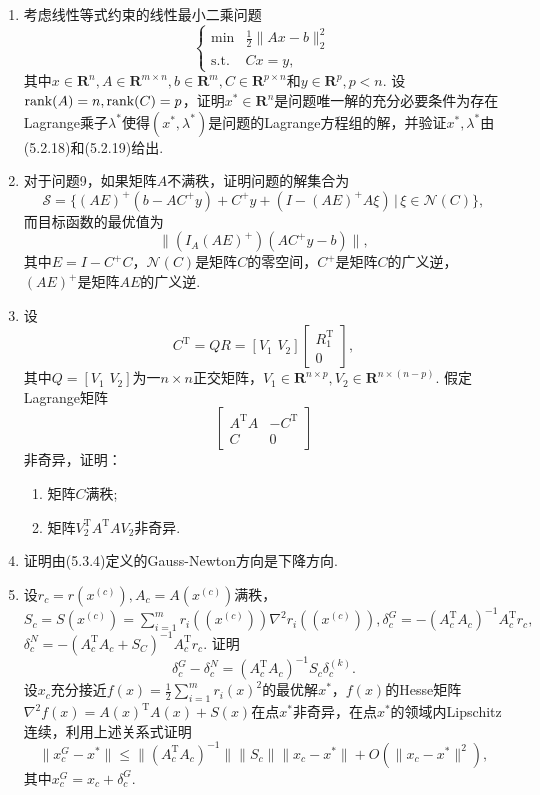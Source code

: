 \begin{enumerate}
    \omitted
    \item 考虑线性等式约束的线性最小二乘问题\[\begin{cases}
        \min & \displaystyle \frac{1}{2}\|Ax-b\|_2^2\\
        \text{s.t.} & Cx=y,
    \end{cases}\]其中$x \in \textbf{R}^n,A \in \textbf{R}^{m \times n},b \in \textbf{R}^m, C \in \textbf{R}^{p \times n}$和$y \in \textbf{R}^p,p<n$. 设$\text{rank}(A)=n,\text{rank}(C)=p$，证明$x^* \in \textbf{R}^n$是问题唯一解的充分必要条件为存在Lagrange乘子$\lambda^*$使得$(x^*,\lambda^*)$是问题的Lagrange方程组的解，并验证$x^*,\lambda^*$由(5.2.18)和(5.2.19)给出.\\
    \omitted
    \item 对于问题9，如果矩阵$A$不满秩，证明问题的解集合为\[\mathcal{S}=\{(AE)^+(b-AC^+y)+C^+y+(I-(AE)^+A\xi )\, | \, \xi \in \mathcal{N}(C)\},\]而目标函数的最优值为\[\|(I_A(AE)^+)(AC^+y-b)\|,\]其中$E=I-C^+C$，$\mathcal{N}(C)$是矩阵$C$的零空间，$C^+$是矩阵$C$的广义逆，$(AE)^+$是矩阵$AE$的广义逆.\\
    \omitted
    \item 设\[C^{\mathrm{T}}=QR=[V_1 \,\, V_2]\begin{bmatrix}
        R_1^{\mathrm{T}}\\0
    \end{bmatrix},\]其中$Q=[V_1 \,\, V_2]$为一$n \times n$正交矩阵，$V_1 \in \textbf{R}^{n \times p},V_2 \in \textbf{R}^{n \times (n-p)}$. 假定Lagrange矩阵\[\begin{bmatrix}
        A^{\mathrm{T}}A & -C^{\mathrm{T}} \\ C & 0
    \end{bmatrix}\]非奇异，证明：
    \begin{enumerate}[label=(\arabic*)]
        \item 矩阵$C$满秩;
        \item 矩阵$V_2^{\mathrm{T}}A^{\mathrm{T}}AV_2$非奇异.
    \end{enumerate}
    \omitted
    \item 证明由(5.3.4)定义的Gauss-Newton方向是下降方向.\\
    \omitted
    \item 设$r_c=r(x^{(c)}),A_c=A(x^{(c)})$满秩，$S_c=S(x^{(c)})=\sum_{i=1}^m r_i((x^{(c)})) \nabla^2 r_i((x^{(c)})),\delta_c^G=-(A_c^{\mathrm{T}}A_c)^{-1}A_c^{\mathrm{T}}r_c,$\\$\delta_c^N=-(A_c^{\mathrm{T}}A_c+S_C)^{-1}A_c^{\mathrm{T}}r_c$. 证明\[\delta_c^G-\delta_c^N=(A_c^{\mathrm{T}}A_c)^{-1}S_c\delta_c^{(k)}.\]设$x_c$充分接近$\displaystyle f(x)=\frac{1}{2}\sum_{i=1}^m r_i(x)^2$的最优解$x^*$，$f(x)$的Hesse矩阵$\nabla^2 f(x)=A(x)^{\mathrm{T}}A(x)+S(x)$在点$x^*$非奇异，在点$x^*$的领域内Lipschitz连续，利用上述关系式证明\[\|x_c^G-x^*\| \leqslant \|(A_c^{\mathrm{T}}A_c)^{-1}\| \|S_c\| \|x_c-x^*\|+O(\|x_c-x^*\|^2),\]其中$x_c^G=x_c+\delta_c^G$.\\

\end{enumerate}
